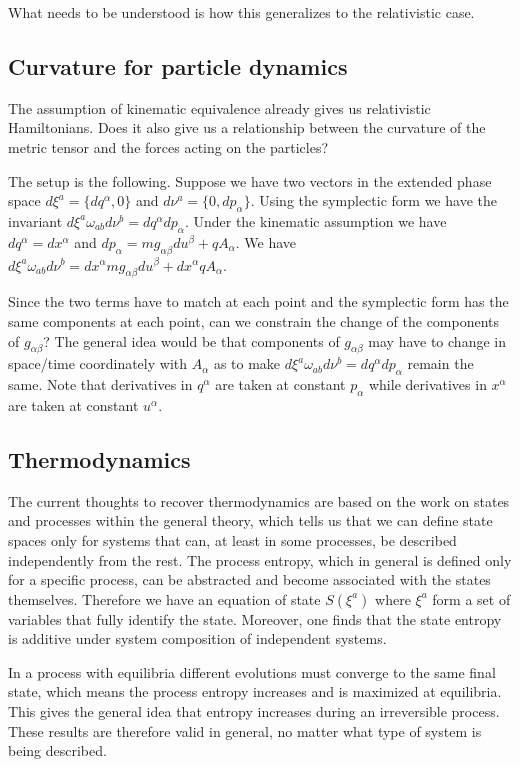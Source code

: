 \documentclass[11pt,letterpaper,fleqn]{memoir} %
\begin{document}
What needs to be understood is how this generalizes to the relativistic case.


\subsection{Curvature for particle dynamics}

The assumption of kinematic equivalence already gives us relativistic Hamiltonians. Does it also give us a relationship between the curvature of the metric tensor and the forces acting on the particles?

The setup is the following. Suppose we have two vectors in the extended phase space $d\xi^a = \{dq^\alpha, 0\}$ and $d\nu^a = \{0, dp_\alpha\}$. Using the symplectic form we have the invariant $d\xi^a \omega_{ab}d\nu^b = dq^\alpha dp_\alpha$. Under the kinematic assumption we have $dq^\alpha = dx^\alpha$ and $dp_\alpha = mg_{\alpha\beta}du^\beta + q A_\alpha$. We have $d\xi^a \omega_{ab}d\nu^b = dx^\alpha m g_{\alpha\beta} du^\beta + dx^\alpha q A_\alpha$.

Since the two terms have to match at each point and the symplectic form has the same components at each point, can we constrain the change of the components of $g_{\alpha\beta}$? The general idea would be that components of $g_{\alpha\beta}$ may have to change in space/time coordinately with $A_\alpha$ as to make $d\xi^a \omega_{ab}d\nu^b = dq^\alpha dp_\alpha$ remain the same. Note that derivatives in $q^\alpha$ are taken at constant $p_\alpha$ while derivatives in $x^\alpha$ are taken at constant $u^\alpha$.

\subsection{Thermodynamics}

The current thoughts to recover thermodynamics are based on the work on states and processes within the general theory, which tells us that we can define state spaces only for systems that can, at least in some processes, be described independently from the rest. The process entropy, which in general is defined only for a specific process, can be abstracted and become associated with the states themselves. Therefore we have an equation of state $S(\xi^a)$ where $\xi^a$ form a set of variables that fully identify the state. Moreover, one finds that the state entropy is additive under system composition of independent systems.

In a process with equilibria different evolutions must converge to the same final state, which means the process entropy increases and is maximized at equilibria. This gives the general idea that entropy increases during an irreversible process. These results are therefore valid in general, no matter what type of system is being described.
\end{document}
